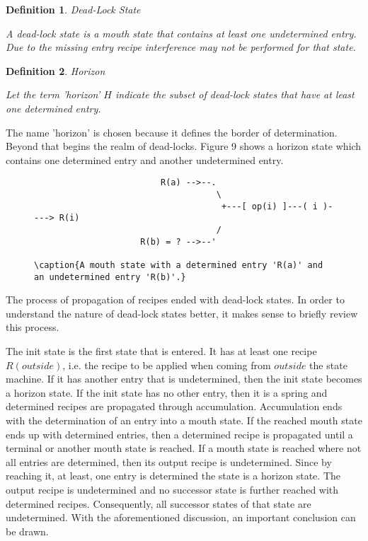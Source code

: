 \documentclass[12pt,a4paper]{scrartcl}
\theoremstyle{break}
\newtheorem{definition}{Definition}
\begin{document}
\begin{definition}
    
Dead-Lock State

A dead-lock state is a mouth state that contains at least one undetermined
entry. Due to the missing entry recipe interference may not be performed
for that state.
\end{definition}

\begin{definition}
Horizon

Let the term 'horizon' $H$ indicate the subset of dead-lock states that have
at least one determined entry.
\end{definition}

The name 'horizon' is chosen because it defines the border of determination.
Beyond that begins the realm of dead-locks. Figure 9 shows a horizon state
which contains one determined entry and another undetermined entry.

\begin{figure}[htbp] \leavevmode
\begin{verbatim}
                         R(a) -->--.
                                    \
                                     +---[ op(i) ]---( i )----> R(i)
                                    /
                     R(b) = ? -->--'

\caption{A mouth state with a determined entry 'R(a)' and 
an undetermined entry 'R(b)'.}
\end{verbatim}
\end{figure}

The process of propagation of recipes ended with dead-lock states. In order
to understand the nature of dead-lock states better, it makes sense to briefly
review this process. 

The init state is the first state that is entered. It has at least one recipe
$R(outside)$, i.e. the recipe to be applied when coming from $outside$ the
state machine. If it has another entry that is undetermined, then the init
state becomes a horizon state. If the init state has no other entry, then it is
a spring and determined recipes are propagated through accumulation.
Accumulation ends with the determination of an entry into a mouth state. If the
reached mouth state ends up with determined entries, then a determined recipe
is propagated until a terminal or another mouth state is reached. If a mouth
state is reached where not all entries are determined, then its output recipe
is undetermined. Since by reaching it, at least, one entry is determined the
state is a horizon state. The output recipe is undetermined and no successor
state is further reached with determined recipes. Consequently, all successor
states of that state are undetermined.  With the aforementioned discussion, an
important conclusion can be drawn.
\end{document}
